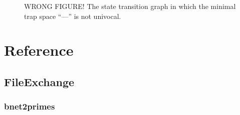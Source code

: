 \documentclass[letterpaper,10pt,english]{sphinxmanual}
\begin{document}
\begin{figure}[htbp]
\centering
\capstart

\noindent{}
\caption{WRONG FIGURE! The state transition graph  in which the minimal trap space “—” is not univocal.}
\begin{sphinxlegend}
\begin{sphinxVerbatim}[commandchars=\\\{\}]
   
 \PYG{p}{[}     \PYG{p}{]}
 
\PYG{p}{[}\PYG{p}{]}  
\end{sphinxVerbatim}
\end{sphinxlegend}
\label{\detokenize{Manual:figure28}}\label{\detokenize{Manual:id31}}\end{figure}


\chapter{Reference}
\label{\detokenize{Reference:networkx-has-path}}\label{\detokenize{Reference::doc}}\label{\detokenize{Reference:reference}}

\section{FileExchange}
\label{\detokenize{FileExchange:fileexchange}}\label{\detokenize{FileExchange::doc}}\label{\detokenize{FileExchange:id1}}

\subsection{bnet2primes}
\label{\detokenize{FileExchange:id2}}\label{\detokenize{FileExchange:bnet2primes}}
\end{document}
